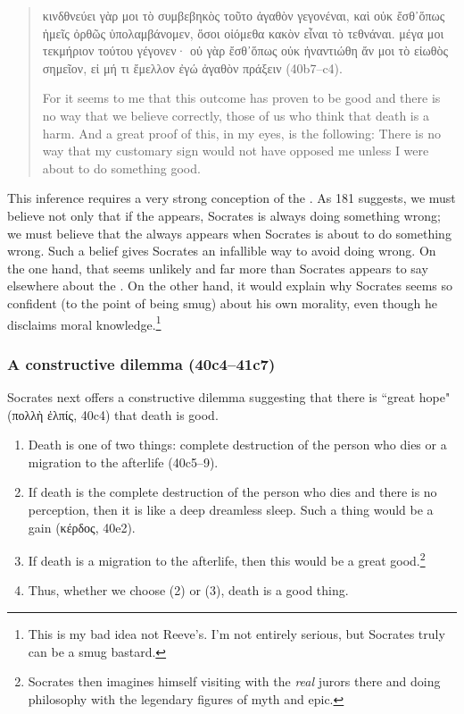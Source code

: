 \documentclass[11pt]{article}
\begin{document}
\begin{quote}
    {\g κινδθνεύει γὰρ μοι τὸ συμβεβηκὸς τοῦτο ἀγαθὸν γεγονέναι, καὶ οὐκ
    ἔσθ᾽ὅπως ἡμεῖς ὀρθῶς ὑπολαμβάνομεν, ὅσοι οἰόμεθα κακὸν εἶναι τὸ τεθνάναι.
    μέγα μοι τεκμήριον τούτου γέγονεν· οὐ γὰρ ἔσθ᾽ὅπως οὐκ ἠναντιώθη ἄν μοι
    τὸ εἰωθὸς σημεῖον, εἰ μή τι ἔμελλον ἐγώ ἀγαθὸν πράξειν} (40b7--c4).

    For it seems to me that this outcome has proven to be good and there is no
    way that we believe correctly, those of us who think that death is a harm.
    And a great proof of this, in my eyes, is the following: There is no way
    that my customary sign would not have opposed me unless I were about to do
    something good.
\end{quote}

This inference requires a very strong conception of the .
As \citet{reeve1989} 181 suggests, we must believe not only that if the
 appears, Socrates is always doing something wrong; we must
believe that the  always appears when Socrates is about to
do something wrong.  Such a belief gives Socrates an infallible way to avoid
doing wrong.  On the one hand, that seems unlikely and far more than Socrates
appears to say elsewhere about the .  On the other hand, it
would explain why Socrates seems so confident (to the point of being smug)
about his own morality, even though he disclaims moral knowledge.\footnote{This
is my bad idea not Reeve's.  I'm not entirely serious, but Socrates truly can
be a smug bastard.}


\subsubsection{A constructive dilemma (40c4--41c7)}

Socrates next offers a constructive dilemma suggesting that there is ``great
hope" ({\g πολλὴ ἐλπίς}, 40c4) that death is good.

\begin{enumerate}
    \item Death is one of two things: complete destruction of the person who
        dies or a migration to the afterlife (40c5--9).
    \item If death is the complete destruction of the person who dies and there
        is no perception, then it is like a deep dreamless sleep.  Such a thing
        would be a gain ({\g κέρδος}, 40e2).
    \item If death is a migration to the afterlife, then this would be a great
        good.\footnote{Socrates then imagines himself visiting with the
        \emph{real} jurors there and doing philosophy with the legendary
        figures of myth and epic.}
    \item Thus, whether we choose (2) or (3), death is a good thing.
\end{enumerate}
\end{document}
